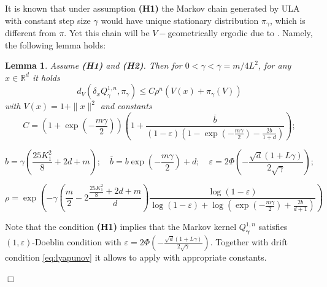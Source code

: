 \documentclass[bj]{imsart}
\def\rset{\mathbb{R}}
\def\rset{\mathbb{R}}
\newcommand{\proofendsign}{$\Box$}
\newtheorem{lem}[thm]{Lemma}
\newenvironment{proof}{{\noindent \bf Proof }}
 {{\hspace*{\fill}\proofendsign\par\bigskip}}
\begin{document}
It is known that under assumption {\bf (H1)} the Markov chain generated by ULA with constant step size $\gamma$ would have unique stationary distribution $\pi_\gamma$, which is different from $\pi$. Yet this chain will be $V-$geometrically ergodic due to \cite[Theorem~19.4.1]{moulines2018}. Namely, the following lemma holds:

\begin{lem}
\label{lem:v_ergodicity}
 Assume  {\bf (H1)} and {\bf (H2)}. Then for $0 < \gamma < \overline{\gamma}=m / 4L^2$, for any $x \in \rset^d$ it holds
$$
d_V(\delta_xQ_{\gamma}^{1,n},\pi_\gamma) \leq C\rho^n\left(V(x) + \pi_\gamma(V)\right)
$$
with $V(x) = 1 + \|x\|^2$ and constants
$$
C = \left(1 + \exp{\left(-\frac{m\gamma}{2}\right)}\right)\left(1+\frac{\overline{b}}{(1-\varepsilon)(1-\exp{\left(-\frac{m\gamma}{2}\right)} - \frac{2b}{1+d})}\right);
$$

$$
b = \gamma(\frac{25K_1^2}{8} + 2d + m); \quad \overline{b} = b\exp{\left(-\frac{m\gamma}{2}\right)} + d; \quad \varepsilon = 2\Phi\left(-\frac{\sqrt{d}(1+L\gamma)}{2\sqrt{\gamma}}\right); \quad
$$

$$
\rho = \exp{\left(-\gamma\left(\frac{m}{2} - 2\frac{\frac{25K_1^2}{8} + 2d + m}{d}\right)\frac{\log{(1-\varepsilon)}}{\log{(1-\varepsilon)} + \log{(\exp{\left(-\frac{m\gamma}{2}\right)} + \frac{2b}{d+1})}}\right)}
$$
\end{lem}

\begin{proof} Note that the condition {\bf (H1)} implies that the Markov kernel $Q^{1,n}_{\boldsymbol{\gamma}}$ satisfies $(1,\varepsilon)$-Doeblin condition with $\varepsilon = 2\Phi\left(-\frac{\sqrt{d}(1+L\gamma)}{2\sqrt{\gamma}}\right)$. Together with drift condition \eqref{eq:lyapunov} it allows to apply \cite[Theorem~19.4.1]{moulines2018} with appropriate constants.
\end{proof}
\end{document}
